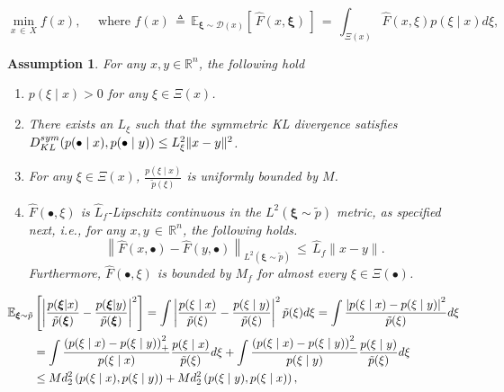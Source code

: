 \documentclass[10pt,a4paper]{amsart}
\newtheorem{assumption}{Assumption}
\newcommand{\E}{\mathbb E}
\newcommand{\R}{\mathbb R}
\newcommand{\bxi}{\boldsymbol{\xi}}
\newcommand{\lln}{\left|}
\newcommand{\lnn}{\left\|}
\newcommand{\pc}[1]{{\color{cyan}#1}}
\newcommand{\rnn}{\right\|}
\newcommand{\rrn}{\right|}
\begin{document}
			\begin{equation}\label{eq:DDproblem}
				\min_{x \, \in \, X} f(x), \quad \mbox{ where } f(x) \, \triangleq  \, \mathbb{E}_{\bxi \sim \mathcal{D}(x)} \left[\, \hat{F}(x, \bxi)\, \right] \, = \, \int_{\Xi(x)} \hat{F}(x, \xi)p(\xi \mid  x) d\xi,
			\end{equation}

				\begin{assumption}\label{asm:decdep}
					For any $x,y\in\R^n$, the following hold 
					\begin{enumerate}
						\item $p(\xi \mid x)>0$ for any $\xi\in\Xi(x)$.
						\item\label{ass:p-x-y-dist} There exists an $L_\xi$ such that the {symmetric KL divergence} satisfies $D_{{\textnormal{KL}}}^{{\rm sym}}(p(\bullet \mid x) , p(\bullet \mid y)) \leq L_\xi^2\|x-y\|^2$. %
						\item\label{ass:p-ratio-bnd} For any $\xi\in\Xi(x)$, $\frac{p(\xi \mid x)}{\tilde{p}(\xi)}$ is uniformly bounded by $M$.
						\item\label{ass:f-hat-Lip} $\hat{F}(\bullet,\xi)$ is $\hat{L}_f$-Lipschitz continuous in the $L^2(\bxi \sim \tilde{p})$ metric, as specified next, i.e., for any $x, y \, \in \, \R^n$, the following holds.
						$$
						{\lnn \hat{F}(x, \bullet) - \hat{F}(y, \bullet) \rnn}_{L^2(\bxi \sim \tilde{p})} \, \leq \, \hat{L}_f \|x-y\|.
						$$
						Furthermore, $\hat{F}(\bullet,\xi)$ is bounded by $M_f$ for almost every $\xi\in\Xi(\bullet)$. 
					\end{enumerate}
				\end{assumption}

				\begin{align}\label{eq:seclast}
					\notag     \E_{\bxi \sim \tilde{p}} &\left[{\lln \dfrac{p(\bxi | x)}{\tilde{p}(\bxi)} - \dfrac{p(\bxi | y)}{\tilde{p}(\bxi)} \rrn}^2 \right] 
					= 
					\int \left|\frac{p(\xi \mid x)}{\tilde{p}(\xi)}-\frac{p(\xi \mid y)}{\tilde{p}(\xi)}\right|^2 \tilde{p}(\xi)d\xi=\int \frac{\left|p(\xi \mid x)-p(\xi \mid y)\right|^2}{\tilde{p}(\xi)} d\xi\nonumber\\
					&=\int \frac{\left(p(\xi \mid x)-p(\xi \mid y)\right)_+^2}{p(\xi \mid x)}\frac{p(\xi \mid x)}{\tilde{p}(\xi)} d\xi+\int \frac{\left(p(\xi \mid x)-p(\xi \mid y)\right)_-^2}{p(\xi \mid y)}\frac{p(\xi \mid y)}{\tilde{p}(\xi)} d\xi\nonumber\\
					& \leq Md^2_2\left(p(\xi \mid x),p(\xi \mid y)\right)+Md^2_2\left(p(\xi \mid y),p(\xi \mid x)\right),
				\end{align}
\end{document}
